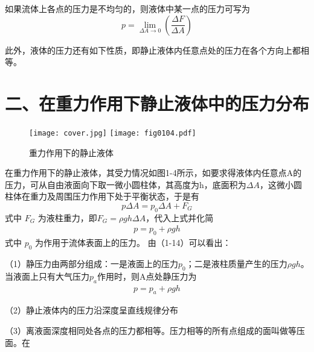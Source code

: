         如果流体上各点的压力是不均匀的，则液体中某一点的压力可写为
$$    p=\lim_{{\Delta A}\to 0}  (\frac {\Delta F}  {\Delta A } )   $$


        此外，液体的压力还有如下性质，即静止液体内任意点处的压力在各个方向上都相等。

\section*{二、在重力作用下静止液体中的压力分布} 

\begin{figure}[!hbt]
    \centering
    \ifOpenSource
    \texttt{[image: cover.jpg]}
    \else
    \texttt{[image: fig0104.pdf]}
    \fi
    \caption{重力作用下的静止液体}
    \label{fig:fig0104}
    \end{figure}

         在重力作用下的静止液体，其受力情况如图1-4所示，如要求得液体内任意点A的压力，可从自由液面向下取一微小圆柱体，其高度为h，底面积为$\Delta{A}$，这微小圆柱体在重力及周围压力作用下处于平衡状态，于是有
$${p\Delta{A}}={p_{0}\Delta{A}}+{F_{G}}$$
式中 ${F_{G}}$ 为液柱重力，即${F_{G}}={{\rho}gh}{\Delta{A}}$，代入上式并化简
\begin{gather}
    {p}={p_{0}}+{{\rho}gh}
\end{gather}
式中 ${p_{0}}$ 为作用于流体表面上的压力。
 由（1-14）可以看出：

（1）静压力由两部分组成：一是液面上的压力${p_{0}}$；二是液柱质量产生的压力${{\rho}gh}$。当液面上只有大气压力${p_{a}}$作用时，则A点处静压力为
\begin{gather}
    {p}={p}_{a}+{{\rho}gh}
\end{gather}

（2）静止液体内的压力沿深度呈直线规律分布

（3）离液面深度相同处各点的压力都相等。压力相等的所有点组成的面叫做等压面。在
